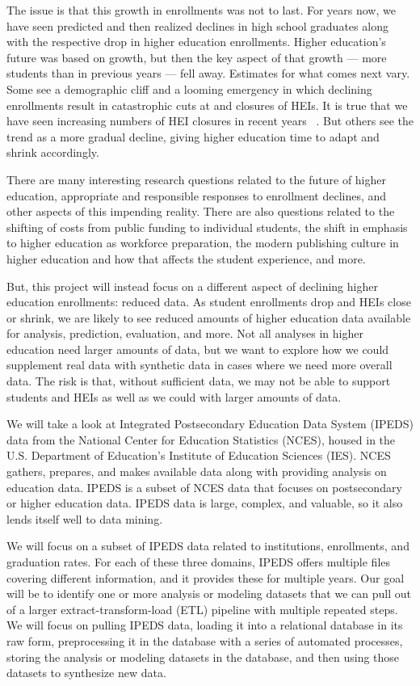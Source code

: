 \documentclass[sigconf, authorversion, nonacm]{acmart}
\begin{document}
    The issue is that this growth in enrollments was not to last. For years now, we have seen predicted and then realized declines in high school graduates along with the respective drop in higher education enrollments. Higher education's future was based on growth, but then the key aspect of that growth --- more students than in previous years --- fell away. Estimates for what comes next vary. Some see a demographic cliff and a looming emergency in which declining enrollments result in catastrophic cuts at and closures of HEIs. It is true that we have seen increasing numbers of HEI closures in recent years ~\cite{hechingercollegeclosures}. But others see the trend as a more gradual decline, giving higher education time to adapt and shrink accordingly. \cite{insidehighereddemographiccliff}

    There are many interesting research questions related to the future of higher education, appropriate and responsible responses to enrollment declines, and other aspects of this impending reality. There are also questions related to the shifting of costs from public funding to individual students, the shift in emphasis to higher education as workforce preparation, the modern publishing culture in higher education and how that affects the student experience, and more.

    But, this project will instead focus on a different aspect of declining higher education enrollments: reduced data. As student enrollments drop and HEIs close or shrink, we are likely to see reduced amounts of higher education data available for analysis, prediction, evaluation, and more. Not all analyses in higher education need larger amounts of data, but we want to explore how we could supplement real data with synthetic data in cases where we need more overall data. The risk is that, without sufficient data, we may not be able to support students and HEIs as well as we could with larger amounts of data.

    We will take a look at Integrated Postsecondary Education Data System (IPEDS) data from the National Center for Education Statistics (NCES), housed in the U.S. Department of Education's Institute of Education Sciences (IES). NCES gathers, prepares, and makes available data along with providing analysis on education data. IPEDS is a subset of NCES data that focuses on postsecondary or higher education data. IPEDS data is large, complex, and valuable, so it also lends itself well to data mining. \cite{ipeds}

    We will focus on a subset of IPEDS data related to institutions, enrollments, and graduation rates. For each of these three domains, IPEDS offers multiple files covering different information, and it provides these for multiple years. Our goal will be to identify one or more analysis or modeling datasets that we can pull out of a larger extract-transform-load (ETL) pipeline with multiple repeated steps. We will focus on pulling IPEDS data, loading it into a relational database in its raw form, preprocessing it in the database with a series of automated processes, storing the analysis or modeling datasets in the database, and then using those datasets to synthesize new data.
\end{document}
